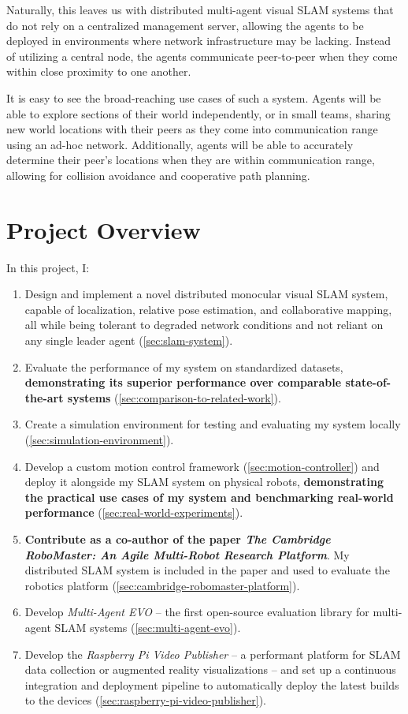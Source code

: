 Naturally, this leaves us with distributed multi-agent visual SLAM systems that do not rely on a centralized management server, allowing the agents to be deployed in environments where network infrastructure may be lacking. Instead of utilizing a central node, the agents communicate peer-to-peer when they come within close proximity to one another.

It is easy to see the broad-reaching use cases of such a system. Agents will be able to explore sections of their world independently, or in small teams, sharing new world locations with their peers as they come into communication range using an ad-hoc network. Additionally, agents will be able to accurately determine their peer's locations when they are within communication range, allowing for collision avoidance and cooperative path planning.

\section{Project Overview}
\label{sec:project-overview}
In this project, I: \noparskip
{
    \begin{enumerate}
        \item Design and implement a novel distributed monocular visual SLAM system, capable of localization, relative pose estimation, and collaborative mapping, all while being tolerant to degraded network conditions and not reliant on any single leader agent (\autoref{sec:slam-system}).
        \item Evaluate the performance of my system on standardized datasets, \textbf{demonstrating its superior performance over comparable state-of-the-art systems} (\autoref{sec:comparison-to-related-work}).
        \item Create a simulation environment for testing and evaluating my system locally (\autoref{sec:simulation-environment}).
        \item Develop a custom motion control framework (\autoref{sec:motion-controller}) and deploy it alongside my SLAM system on physical robots, \textbf{demonstrating the practical use cases of my system and benchmarking real-world performance} (\autoref{sec:real-world-experiments}).
        \item \textbf{Contribute as a co-author of the paper \textit{The Cambridge RoboMaster: An Agile Multi-Robot Research Platform}}. My distributed SLAM system is included in the paper and used to evaluate the robotics platform (\autoref{sec:cambridge-robomaster-platform}).
        \item Develop \textit{Multi-Agent EVO} – the first open-source evaluation library for multi-agent SLAM systems (\autoref{sec:multi-agent-evo}).
        \item Develop the \textit{Raspberry Pi Video Publisher} – a performant platform for SLAM data collection or augmented reality visualizations – and set up a continuous integration and deployment pipeline to automatically deploy the latest builds to the devices (\autoref{sec:raspberry-pi-video-publisher}).
    \end{enumerate}
}

